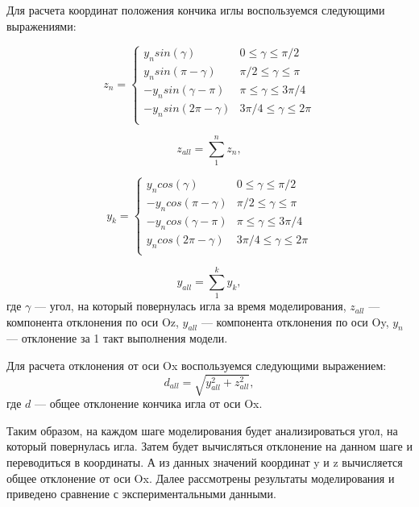 \documentclass[10pt]{article}
\begin{document}
Для расчета координат положения кончика иглы воспользуемся следующими выражениями:

\begin{equation} \label{eq7}
z_{n} = 
 \begin{cases}
   y_{n} sin(\gamma) &{ 0 \leq \gamma \leq \pi/2 }\\
   y_{n} sin(\pi - \gamma) &{ \pi/2 \leq \gamma \leq \pi }\\
  - y_{n} sin( \gamma - \pi) &{ \pi \leq \gamma \leq 3\pi/4 }\\
   - y_{n} sin(2\pi -  \gamma) &{ 3\pi/4 \leq \gamma \leq 2\pi }\\
 \end{cases}
\end{equation}

\begin{equation} \label{eq8}
z_{all} = \sum\limits_{1}^{n} z_{n},
\end{equation}

\begin{equation} \label{eq9}
y_{k} = 
 \begin{cases}
   y_{n} cos(\gamma) &{ 0 \leq \gamma \leq \pi/2 }\\
   - y_{n} cos(\pi - \gamma) &{ \pi/2 \leq \gamma \leq \pi }\\
  - y_{n} cos( \gamma - \pi) &{ \pi \leq \gamma \leq 3\pi/4 }\\
    y_{n} cos(2\pi -  \gamma) &{ 3\pi/4 \leq \gamma \leq 2\pi }\\
 \end{cases}
\end{equation}

\begin{equation} \label{eq10}
y_{all} = \sum\limits_{1}^{k} y_{k},
\end{equation}
где $\gamma$ --- угол, на который повернулась игла за время моделирования, $z_{all} $ --- компонента отклонения по оси Oz, $y_{all}$ --- компонента отклонения по оси Oy, $y_{n}$ --- отклонение за 1 такт выполнения модели.

Для расчета отклонения от оси Ox воспользуемся следующими выражением:
\begin{equation} \label{eq11}
d_{all} = \sqrt{y_{all}^2  +  z_{all} ^2},
\end{equation}
где $d$ --- общее отклонение кончика игла от оси Ox.

Таким образом, на каждом шаге моделирования будет анализироваться угол, на который повернулась игла. Затем будет вычисляться отклонение на данном шаге и переводиться в координаты. А из данных значений координат y и z вычисляется общее отклонение от оси Ox.
Далее рассмотрены результаты моделирования и приведено сравнение с экспериментальными данными.
\end{document}
